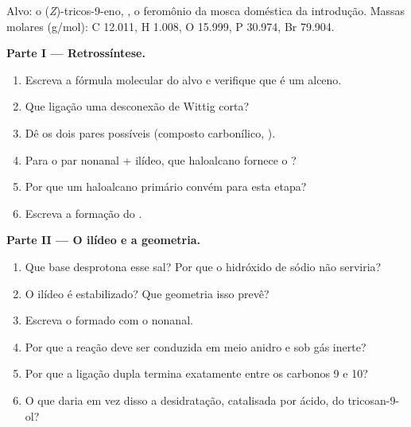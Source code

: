 \begin{problem}
\label{pb:b2:wittig:1}
Alvo: o (\textit{Z})-tricos-9-eno, , o feromônio da mosca doméstica da
introdução. Massas molares (\unit{g/mol}): C 12.011, H 1.008, O 15.999, P 30.974, Br 79.904.

\medskip
\noindent\textbf{Parte I --- Retrossíntese.}
\begin{enumerate}
  \item Escreva a fórmula molecular do alvo e verifique que é um alceno.
  \item Que ligação uma desconexão de Wittig corta?
  \item Dê os dois pares possíveis (composto carbonílico, ).
  \item Para o par nonanal + ilídeo, que haloalcano fornece o ?
  \item Por que um haloalcano primário convém para esta etapa?
  \item Escreva a formação do .
\end{enumerate}

\medskip
\noindent\textbf{Parte II --- O ilídeo e a geometria.}
\begin{enumerate}[resume]
  \item Que base desprotona esse sal? Por que o hidróxido de sódio não serviria?
  \item O ilídeo é estabilizado? Que geometria isso prevê?
  \item Escreva o  formado com o nonanal.
  \item Por que a reação deve ser conduzida em meio anidro e sob gás inerte?
  \item Por que a ligação dupla termina exatamente entre os carbonos 9 e 10?
  \item O que daria em vez disso a desidratação, catalisada por ácido, do tricosan-9-ol?
\end{enumerate}


\end{problem}
